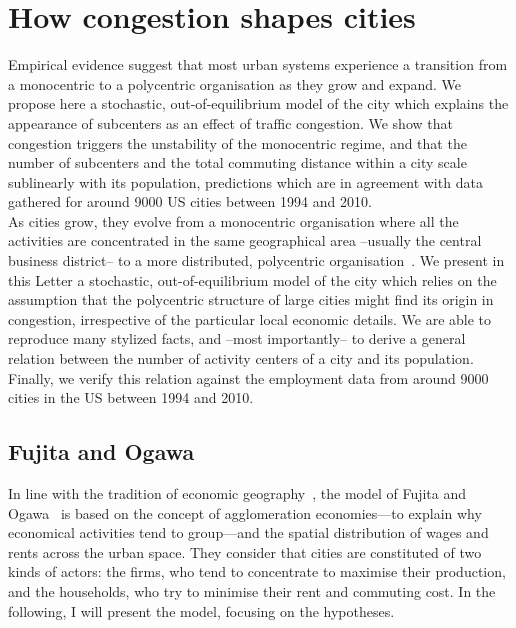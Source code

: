 \chapter{How congestion shapes cities}

Empirical evidence suggest that most urban systems experience a
transition from a monocentric to a polycentric organisation as they
grow and expand. We propose here a stochastic, out-of-equilibrium model of the
city which explains the appearance of subcenters as an effect of
traffic congestion. We show that congestion triggers the unstability
of the monocentric regime, and that the number of subcenters and the
total commuting distance within a city scale sublinearly with its
population, predictions which are in agreement with data gathered for
around 9000 US cities between 1994 and 2010.\\


As cities grow, they evolve from a monocentric organisation where all
the activities are concentrated in the same geographical area
--usually the central business district-- to a more distributed,
polycentric organisation~\cite{Kemper:1974,Odland:1978,Mills:1972,Griffith_PG:1981,Dokmeci:1994,McMillen:2003,Pereira:2013,Roth:2011}.  We present in this Letter a stochastic, out-of-equilibrium model of the
city which relies on the assumption that the polycentric structure of
large cities might find its origin in congestion, irrespective of the
particular local economic details. We are able to reproduce many
stylized facts, and --most importantly-- to derive a general relation
between the number of activity centers of a city and its
population. Finally, we verify this relation against the employment
data from around 9000 cities in the US between 1994 and 2010.



\section{Fujita and Ogawa}
\label{sec:fujita_and_ogawa}

In line with the tradition of economic geography~\cite{Fujita:2001}, the model
of Fujita and Ogawa~\cite{Fujita:1982} is based on the concept of agglomeration
economies---to explain why economical activities tend to group---and the spatial
distribution of wages and rents across the urban space. They consider that
cities are constituted of two kinds of actors: the firms, who tend to
concentrate to maximise their production, and the households, who try to
minimise their rent and commuting cost. In the following, I will present the
model, focusing on the hypotheses.\\ 

